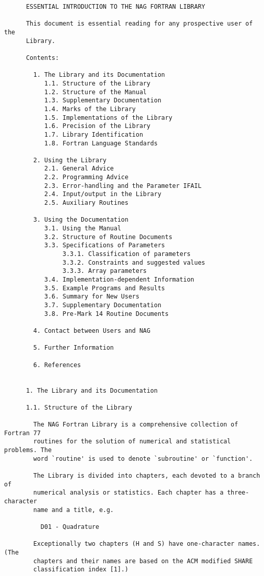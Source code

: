 \begin{small}
\begin{verbatim}
      ESSENTIAL INTRODUCTION TO THE NAG FORTRAN LIBRARY

      This document is essential reading for any prospective user of the
      Library.

      Contents:

        1. The Library and its Documentation
           1.1. Structure of the Library
           1.2. Structure of the Manual
           1.3. Supplementary Documentation
           1.4. Marks of the Library
           1.5. Implementations of the Library
           1.6. Precision of the Library
           1.7. Library Identification
           1.8. Fortran Language Standards

        2. Using the Library
           2.1. General Advice
           2.2. Programming Advice
           2.3. Error-handling and the Parameter IFAIL
           2.4. Input/output in the Library
           2.5. Auxiliary Routines

        3. Using the Documentation
           3.1. Using the Manual
           3.2. Structure of Routine Documents
           3.3. Specifications of Parameters
                3.3.1. Classification of parameters
                3.3.2. Constraints and suggested values
                3.3.3. Array parameters
           3.4. Implementation-dependent Information
           3.5. Example Programs and Results
           3.6. Summary for New Users
           3.7. Supplementary Documentation
           3.8. Pre-Mark 14 Routine Documents

        4. Contact between Users and NAG

        5. Further Information

        6. References


      1. The Library and its Documentation

      1.1. Structure of the Library

        The NAG Fortran Library is a comprehensive collection of Fortran 77
        routines for the solution of numerical and statistical problems. The
        word `routine' is used to denote `subroutine' or `function'.

        The Library is divided into chapters, each devoted to a branch of
        numerical analysis or statistics. Each chapter has a three-character
        name and a title, e.g.

          D01 - Quadrature

        Exceptionally two chapters (H and S) have one-character names. (The
        chapters and their names are based on the ACM modified SHARE
        classification index [1].)


\end{verbatim}
\end{small}
